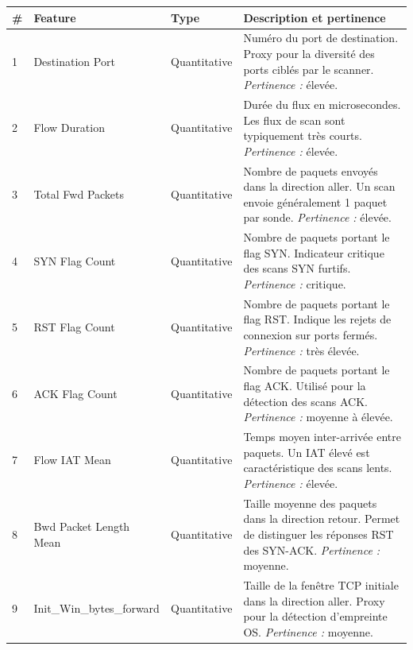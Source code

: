 \documentclass[12pt,a4paper]{article}
\begin{document}
\begin{table}[h!]
\centering
\small
\renewcommand{\arraystretch}{1.35}
\begin{tabularx}{\textwidth}{l l l X}
\toprule
\textbf{\#} & \textbf{Feature} & \textbf{Type} & \textbf{Description et pertinence} \\
\midrule
 1 & Destination Port      & Quantitative & Num\'{e}ro du port de destination.
   Proxy pour la diversit\'{e} des ports cibl\'{e}s par le scanner.
   \textit{Pertinence :} \'{e}lev\'{e}e. \\[0.4em]

 2 & Flow Duration         & Quantitative & Dur\'{e}e du flux en microsecondes.
   Les flux de scan sont typiquement tr\`{e}s courts.
   \textit{Pertinence :} \'{e}lev\'{e}e. \\[0.4em]

 3 & Total Fwd Packets     & Quantitative & Nombre de paquets envoy\'{e}s dans la
   direction aller. Un scan envoie g\'{e}n\'{e}ralement 1 paquet par sonde.
   \textit{Pertinence :} \'{e}lev\'{e}e. \\[0.4em]

 4 & SYN Flag Count        & Quantitative & Nombre de paquets portant le flag SYN.
   Indicateur critique des scans SYN furtifs.
   \textit{Pertinence :} critique. \\[0.4em]

 5 & RST Flag Count        & Quantitative & Nombre de paquets portant le flag RST.
   Indique les rejets de connexion sur ports ferm\'{e}s.
   \textit{Pertinence :} tr\`{e}s \'{e}lev\'{e}e. \\[0.4em]

 6 & ACK Flag Count        & Quantitative & Nombre de paquets portant le flag ACK.
   Utilis\'{e} pour la d\'{e}tection des scans ACK.
   \textit{Pertinence :} moyenne \`{a} \'{e}lev\'{e}e. \\[0.4em]

 7 & Flow IAT Mean         & Quantitative & Temps moyen inter-arriv\'{e}e entre
   paquets. Un IAT \'{e}lev\'{e} est caract\'{e}ristique des scans lents.
   \textit{Pertinence :} \'{e}lev\'{e}e. \\[0.4em]

 8 & Bwd Packet Length Mean & Quantitative & Taille moyenne des paquets dans la
   direction retour. Permet de distinguer les r\'{e}ponses RST des SYN-ACK.
   \textit{Pertinence :} moyenne. \\[0.4em]

 9 & Init\_Win\_bytes\_forward & Quantitative & Taille de la fen\^{e}tre TCP
   initiale dans la direction aller. Proxy pour la d\'{e}tection d'empreinte OS.
   \textit{Pertinence :} moyenne. \\[0.4em]


\end{tabularx}
\end{table}
\end{document}
